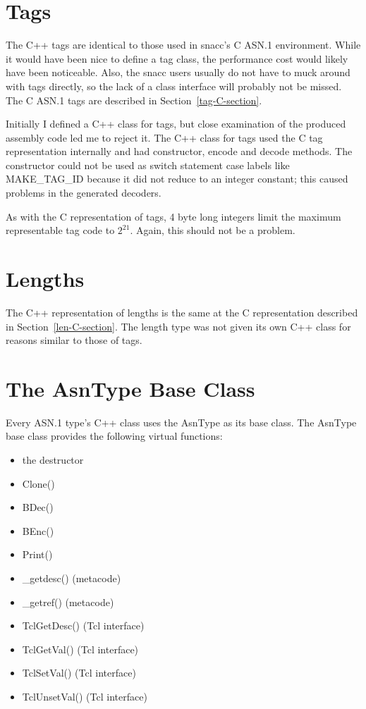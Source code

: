 \section{\label{tag-C++-section}Tags}

The C++ tags are identical to those used in snacc's C ASN.1
environment.  While it would have been nice to define a tag class, the
performance cost would likely have been noticeable.  Also, the snacc
users usually do not have to muck around with tags directly, so the
lack of a class interface will probably not be missed.  The C ASN.1
tags are described in Section~\ref{tag-C-section}.

Initially I defined a C++ class for tags, but close examination of the
produced assembly code led me to reject it.  The C++ class for tags
used the C tag representation internally and had constructor, encode
and decode methods.  The constructor could not be used as
{\C switch} statement case labels like {\C MAKE\_TAG\_ID} because it
did not reduce to an integer constant; this caused problems in the
generated decoders.

As with the C representation of tags, 4 byte long integers limit the
maximum representable tag code to $2^{21}$.  Again, this should not be
a problem.


\section{\label{len-C++-section}Lengths}

The C++ representation of lengths is the same at the C representation
described in Section~\ref{len-C-section}.  The length type was not given
its own C++ class for reasons similar to those of tags.


\section{\label{asntype-C++-section}The AsnType Base Class}

Every ASN.1 type's C++ class uses the {\C AsnType} as its base class.
The {\C AsnType} base class provides the following virtual functions:
\begin{itemize}
  \item the destructor
  \item {\C Clone()}
  \item {\C BDec()}
  \item {\C BEnc()}
  \item {\C Print()}
  \item {\C \_getdesc()} (metacode)
  \item {\C \_getref()} (metacode)
  \item {\C TclGetDesc()} (Tcl interface)
  \item {\C TclGetVal()} (Tcl interface)
  \item {\C TclSetVal()} (Tcl interface)
  \item {\C TclUnsetVal()} (Tcl interface)
\end{itemize}

